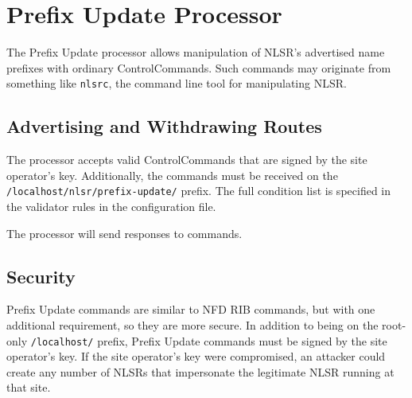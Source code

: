 \section{Prefix Update Processor}
\label{sec:prefix-update}

The Prefix Update processor allows manipulation of NLSR's advertised
name prefixes with ordinary ControlCommands. Such commands may
originate from something like \texttt{nlsrc}, the command line tool
for manipulating NLSR.

\subsection{Advertising and Withdrawing Routes}
The processor accepts valid ControlCommands that are signed by the site operator's key. Additionally, the commands must be received on the \texttt{/localhost/nlsr/prefix-update/} prefix. The full condition list is specified in the validator rules in the configuration file.

The processor will send responses to commands.

\subsection{Security}
Prefix Update commands are similar to NFD RIB commands, but with one
additional requirement, so they are more secure. In addition to being
on the root-only \texttt{/localhost/} prefix, Prefix Update commands
must be signed by the site operator's key. If the site operator's key
were compromised, an attacker could create any number of NLSRs that
impersonate the legitimate NLSR running at that site.
